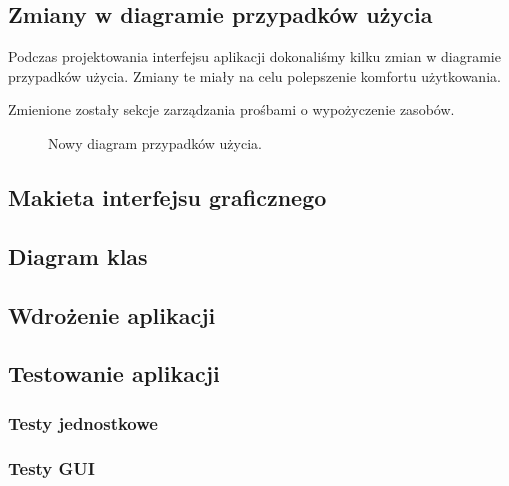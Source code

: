 

    
\subsection{Zmiany w diagramie przypadków użycia}
Podczas projektowania interfejsu aplikacji dokonaliśmy kilku zmian w diagramie przypadków użycia. 
Zmiany te miały na celu polepszenie komfortu użytkowania.

Zmienione zostały sekcje zarządzania prośbami o wypożyczenie zasobów.

\begin{figure}[H]
    \centering
    \caption{Nowy diagram przypadków użycia.}
\end{figure}



\subsection{Makieta interfejsu graficznego} 


\subsection{Diagram klas}


\subsection{Wdrożenie aplikacji}


\subsection{Testowanie aplikacji}
    \subsubsection{Testy jednostkowe}
    

    \subsubsection{Testy GUI}
    
